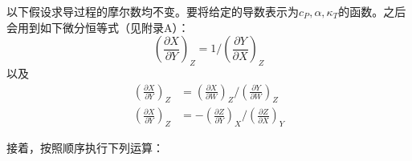 以下假设求导过程的摩尔数均不变。要将给定的导数表示为$c_P, \alpha, \kappa_T$的函数。之后会用到如下微分恒等式（见附录A）：
\begin{equation}
	\left( \frac{\partial X}{\partial Y} \right)_Z = 1 \Big/ \left(\frac{\partial Y}{\partial X} \right)_Z 
\label{equ7.33}
\end{equation}
以及
\begin{align}
	\left( \frac{\partial X}{\partial Y} \right)_Z &= \left( \frac{\partial X}{\partial W} \right)_Z \Bigg/ \left( \frac{\partial Y}{\partial W} \right)_Z \label{equ7.34} \\
	\left( \frac{\partial X}{\partial Y} \right)_Z &= - \left( \frac{\partial Z}{\partial Y} \right)_X \Bigg/ \left( \frac{\partial Z}{\partial X} \right)_Y \label{equ7.35}
\end{align}

接着，按照顺序执行下列运算：

